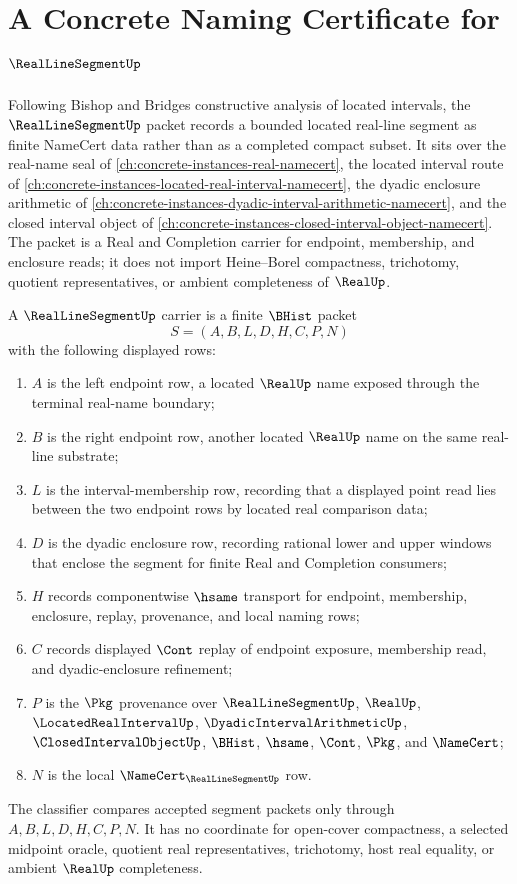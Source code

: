 \chapter{A Concrete Naming Certificate for $\RealLineSegmentUp$}
\label{ch:concrete-instances-real-line-segment-namecert}

Following Bishop and Bridges constructive analysis of located intervals, the $\RealLineSegmentUp$ packet records a bounded located real-line segment as finite NameCert data rather than as a completed compact subset. It sits over the real-name seal of \autoref{ch:concrete-instances-real-namecert}, the located interval route of \autoref{ch:concrete-instances-located-real-interval-namecert}, the dyadic enclosure arithmetic of \autoref{ch:concrete-instances-dyadic-interval-arithmetic-namecert}, and the closed interval object of \autoref{ch:concrete-instances-closed-interval-object-namecert}. The packet is a Real and Completion carrier for endpoint, membership, and enclosure reads; it does not import Heine--Borel compactness, trichotomy, quotient representatives, or ambient completeness of $\RealUp$.

\begin{definition}
\label{def:real-line-segment-carrier}
A $\RealLineSegmentUp$ carrier is a finite $\BHist$ packet
$$
S=(A,B,L,D,H,C,P,N)
$$
with the following displayed rows:
\begin{enumerate}
\item $A$ is the left endpoint row, a located $\RealUp$ name exposed through the terminal real-name boundary;
\item $B$ is the right endpoint row, another located $\RealUp$ name on the same real-line substrate;
\item $L$ is the interval-membership row, recording that a displayed point read lies between the two endpoint rows by located real comparison data;
\item $D$ is the dyadic enclosure row, recording rational lower and upper windows that enclose the segment for finite Real and Completion consumers;
\item $H$ records componentwise $\hsame$ transport for endpoint, membership, enclosure, replay, provenance, and local naming rows;
\item $C$ records displayed $\Cont$ replay of endpoint exposure, membership read, and dyadic-enclosure refinement;
\item $P$ is the $\Pkg$ provenance over $\RealLineSegmentUp$, $\RealUp$, $\LocatedRealIntervalUp$, $\DyadicIntervalArithmeticUp$, $\ClosedIntervalObjectUp$, $\BHist$, $\hsame$, $\Cont$, $\Pkg$, and $\NameCert$;
\item $N$ is the local $\NameCert_{\RealLineSegmentUp}$ row.
\end{enumerate}
The classifier compares accepted segment packets only through $A,B,L,D,H,C,P,N$. It has no coordinate for open-cover compactness, a selected midpoint oracle, quotient real representatives, trichotomy, host real equality, or ambient $\RealUp$ completeness.
\end{definition}

